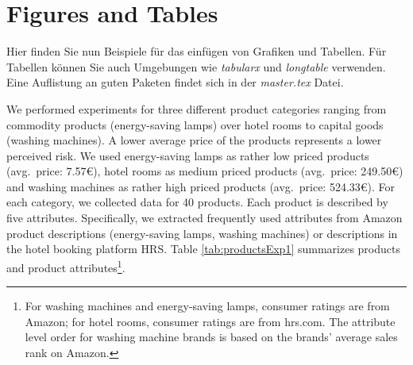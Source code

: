\chapter{Figures and Tables} \label{chap:figuresTables}

Hier finden Sie nun Beispiele für das einfügen von Grafiken und Tabellen. Für Tabellen können Sie auch Umgebungen wie \emph{tabularx} und \emph{longtable} verwenden. Eine Auflistung an guten Paketen findet sich in der \emph{master.tex} Datei.

We performed experiments for three different product categories ranging from commodity products (energy-saving lamps) over hotel rooms to capital goods (washing machines). A lower average price of the products represents a lower perceived risk. We used energy-saving lamps as rather low priced products (avg.\ price: 7.57\euro), hotel rooms as medium priced products (avg.\ price: 249.50\euro) and washing machines as rather high priced products (avg.\ price: 524.33\euro). For each category, we collected data for 40 products. Each product is described by five attributes. Specifically, we extracted frequently used attributes from Amazon product descriptions (energy-saving lamps, washing machines) or descriptions in the hotel booking platform HRS. Table \ref{tab:productsExp1} summarizes products and product attributes\footnote{For washing machines and energy-saving lamps, consumer ratings are from Amazon; for hotel rooms, consumer ratings are from hrs.com. The attribute level order for washing machine brands is based on the brands' average sales rank on Amazon.}.

